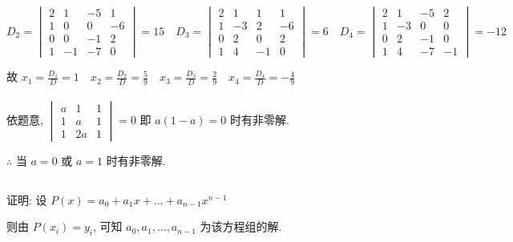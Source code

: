 \begin{enumerate}
			      \( D_{2} = \begin{vmatrix}
				      2 & 1  & -5 & 1  \\
				      1 & 0  & 0  & -6 \\
				      0 & 0  & -1 & 2  \\
				      1 & -1 & -7 & 0
			      \end{vmatrix} = 15 \quad D_{3} = \begin{vmatrix}
				      2 & 1  & 1  & 1  \\
				      1 & -3 & 2  & -6 \\
				      0 & 2  & 0  & 2  \\
				      1 & 4  & -1 & 0
			      \end{vmatrix} = 6 \quad D_{4} = \begin{vmatrix}
				      2 & 1  & -5 & 2  \\
				      1 & -3 & 0  & 0  \\
				      0 & 2  & -1 & 0  \\
				      1 & 4  & -7 & -1
			      \end{vmatrix} = -12 \)

			      故 \( x_{1} = \frac{D_{1}}{D} = 1 \quad x_{2} = \frac{D_{2}}{D} = \frac{5}{9} \quad x_{3} = \frac{D_{3}}{D} = \frac{2}{9} \quad x_{4} = \frac{D_{4}}{D} = -\frac{4}{9} \)
		\end{enumerate}


	\paragraph{} %
		依题意, \( \begin{vmatrix}
			a & 1  & 1 \\
			1 & a  & 1 \\
			1 & 2a & 1
		\end{vmatrix} = 0 \) 即 \( a(1-a) = 0 \) 时有非零解.

		\( \therefore \) 当 \( a = 0 \) 或 \( a = 1 \) 时有非零解.


\subsection{} %


	\paragraph{} %
		证明: 设 \( P(x) = a_{0} + a_{1}x + \dots + a_{n-1}x^{n-1} \)

		则由 \( P(x_{i}) = y_{i} \), 可知 \( a_{0}, a_{1}, \dots, a_{n-1} \) 为该方程组的解.

